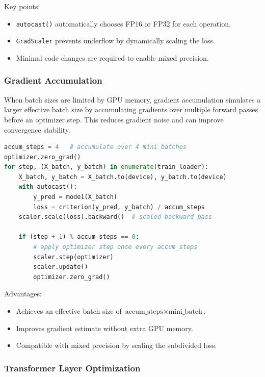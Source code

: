 \documentclass{article}
\begin{document}
Key points:
\begin{itemize}
  \item \texttt{autocast()} automatically chooses FP16 or FP32 for each operation.
  \item \texttt{GradScaler} prevents underflow by dynamically scaling the loss.
  \item Minimal code changes are required to enable mixed precision.
\end{itemize}

\subsubsection{Gradient Accumulation}

When batch sizes are limited by GPU memory, gradient accumulation simulates a larger effective batch size by accumulating gradients over multiple forward passes before an optimizer step. This reduces gradient noise and can improve convergence stability.

\begin{lstlisting}[language=Python, caption={Gradient Accumulation Example}]
accum_steps = 4   # accumulate over 4 mini batches
optimizer.zero_grad()
for step, (X_batch, y_batch) in enumerate(train_loader):
    X_batch, y_batch = X_batch.to(device), y_batch.to(device)
    with autocast():
        y_pred = model(X_batch)
        loss = criterion(y_pred, y_batch) / accum_steps
    scaler.scale(loss).backward()  # scaled backward pass

    if (step + 1) % accum_steps == 0:
        # apply optimizer step once every accum_steps
        scaler.step(optimizer)
        scaler.update()
        optimizer.zero_grad()
\end{lstlisting}

Advantages:
\begin{itemize}
  \item Achieves an effective batch size of \(\text{accum\_steps} \times \text{mini\_batch}\).
  \item Improves gradient estimate without extra GPU memory.
  \item Compatible with mixed precision by scaling the subdivided loss.
\end{itemize}

\subsubsection{Transformer Layer Optimization}
\end{document}
